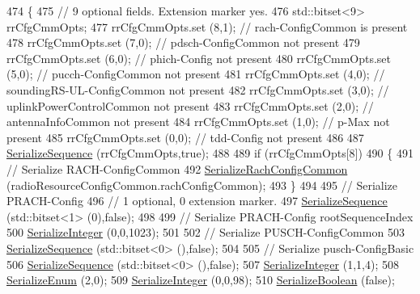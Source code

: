 \begin{DoxyCode}
474 \{
475   \textcolor{comment}{// 9 optional fields. Extension marker yes.}
476   std::bitset<9> rrCfgCmmOpts;
477   rrCfgCmmOpts.set (8,1); \textcolor{comment}{// rach-ConfigCommon is present}
478   rrCfgCmmOpts.set (7,0); \textcolor{comment}{// pdsch-ConfigCommon not present}
479   rrCfgCmmOpts.set (6,0); \textcolor{comment}{// phich-Config not present}
480   rrCfgCmmOpts.set (5,0); \textcolor{comment}{// pucch-ConfigCommon  not present}
481   rrCfgCmmOpts.set (4,0); \textcolor{comment}{// soundingRS-UL-ConfigCommon not present}
482   rrCfgCmmOpts.set (3,0); \textcolor{comment}{// uplinkPowerControlCommon not present}
483   rrCfgCmmOpts.set (2,0); \textcolor{comment}{// antennaInfoCommon not present}
484   rrCfgCmmOpts.set (1,0); \textcolor{comment}{// p-Max not present}
485   rrCfgCmmOpts.set (0,0); \textcolor{comment}{// tdd-Config not present}
486 
487   \hyperlink{classns3_1_1Asn1Header_aa9744858380443ed95836fed08799aed}{SerializeSequence} (rrCfgCmmOpts,\textcolor{keyword}{true});
488 
489   \textcolor{keywordflow}{if} (rrCfgCmmOpts[8])
490     \{
491       \textcolor{comment}{// Serialize RACH-ConfigCommon}
492       \hyperlink{classns3_1_1RrcAsn1Header_af915db4fdcfa7d2acb1748d0007afe70}{SerializeRachConfigCommon} (radioResourceConfigCommon.rachConfigCommon);
493     \}
494 
495   \textcolor{comment}{// Serialize PRACH-Config}
496   \textcolor{comment}{// 1 optional, 0 extension marker.}
497   \hyperlink{classns3_1_1Asn1Header_aa9744858380443ed95836fed08799aed}{SerializeSequence} (std::bitset<1> (0),\textcolor{keyword}{false});
498 
499   \textcolor{comment}{// Serialize PRACH-Config rootSequenceIndex}
500   \hyperlink{classns3_1_1Asn1Header_ab1c3bd37730affa7473bc759d625c29a}{SerializeInteger} (0,0,1023);
501 
502   \textcolor{comment}{// Serialize PUSCH-ConfigCommon}
503   \hyperlink{classns3_1_1Asn1Header_aa9744858380443ed95836fed08799aed}{SerializeSequence} (std::bitset<0> (),\textcolor{keyword}{false});
504 
505   \textcolor{comment}{// Serialize pusch-ConfigBasic}
506   \hyperlink{classns3_1_1Asn1Header_aa9744858380443ed95836fed08799aed}{SerializeSequence} (std::bitset<0> (),\textcolor{keyword}{false});
507   \hyperlink{classns3_1_1Asn1Header_ab1c3bd37730affa7473bc759d625c29a}{SerializeInteger} (1,1,4);
508   \hyperlink{classns3_1_1Asn1Header_ac8e56956823ab8e4470c09e162e7bf24}{SerializeEnum} (2,0);
509   \hyperlink{classns3_1_1Asn1Header_ab1c3bd37730affa7473bc759d625c29a}{SerializeInteger} (0,0,98);
510   \hyperlink{classns3_1_1Asn1Header_a28e3626acdffec71c0376f4f3e7e7ec4}{SerializeBoolean} (\textcolor{keyword}{false});

\end{DoxyCode}
